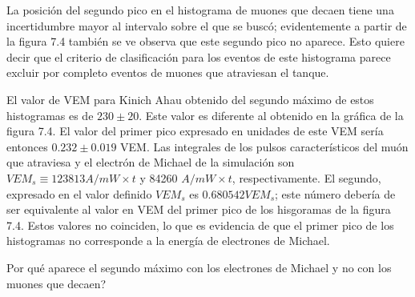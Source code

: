 \documentclass{book}
\begin{document}
La posici\'on del segundo pico en el histograma de muones que decaen tiene una incertidumbre mayor al intervalo sobre el que se busc\'o; evidentemente a partir de la figura 7.4 tambi\'en se ve observa que este segundo pico no aparece. Esto quiere decir que el criterio de clasificaci\'on para los eventos de este histograma parece excluir por completo eventos de muones que atraviesan el tanque.

El valor de VEM para Kinich Ahau obtenido del segundo m\'aximo de estos histogramas es de $230 \pm 20$. Este valor es diferente al obtenido en la gr\'afica de la figura 7.4. El valor del primer pico expresado en unidades de este VEM ser\'ia entonces $0.232 \pm 0.019$ VEM. Las integrales de los pulsos caracter\'isticos del mu\'on que atraviesa y el electr\'on de Michael de la simulaci\'on son $VEM_s \equiv 123813 A/mW\times t$ y 84260 $A/mW\times t$, respectivamente. El segundo, expresado en el valor definido $VEM_s$ es $0.680542 VEM_s$; este n\'umero deber\'ia de ser equivalente al valor en VEM del primer pico de los hisgoramas de la figura 7.4. Estos valores no coinciden, lo que es evidencia de que el primer pico de los histogramas no corresponde a la energ\'ia de electrones de Michael.

Por qu\'e aparece el segundo m\'aximo con los electrones de Michael y no con los muones que decaen?



\end{document}
